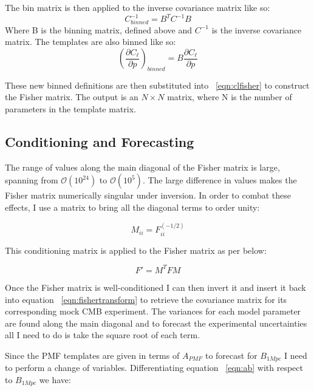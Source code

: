 The bin matrix is then applied to the inverse covariance matrix like so:
\begin{equation}
\label{eqn:bintransform}
C^{-1}_{binned} = B^{T} C^{-1} B
\end{equation}
Where B is the binning matrix, defined above and $C^{-1}$ is the inverse covariance matrix. The templates are also binned like so:
\begin{equation}
(\frac{\partial C_{\ell}}{\partial p})_{binned} = B\frac{\partial C_{\ell}}{\partial p}
\end{equation}
 
These new binned definitions are then substituted into ~\ref{eqn:clfisher} to construct the Fisher matrix. The output is an $N \times N$ matrix, where N is the number of parameters in the template matrix.

\subsection{Conditioning and Forecasting}

The range of values along the main diagonal of the Fisher matrix is large, spanning from $\mathcal{O} (10^{24})$ to $\mathcal{O} (10^{5})$. The large difference in values makes the Fisher matrix numerically singular under inversion. In order to combat these effects, I use a matrix to bring all the diagonal terms to order unity:

\begin{equation}
\label{eqn:condition}
M_{ii} = F^{(-1/2)}_{ii}
\end{equation}
 
This conditioning matrix is applied to the Fisher matrix as per below:

\begin{equation}
\label{eqn:fishertransform}
F' = M^{T} F M
\end{equation}
 
Once the Fisher matrix is well-conditioned I can then invert it and insert it back into equation ~\ref{eqn:fishertransform} to retrieve the covariance matrix for its corresponding mock CMB experiment. The variances for each model parameter are found along the main diagonal and to forecast the experimental uncertainties all I need to do is take the square root of each term.

Since the PMF templates are given in terms of $A_{PMF}$ to forecast for $B_{1Mpc}$ I need to perform a change of variables. Differentiating equation ~\ref{eqn:ab} with respect to $B_{1Mpc}$ we have:

